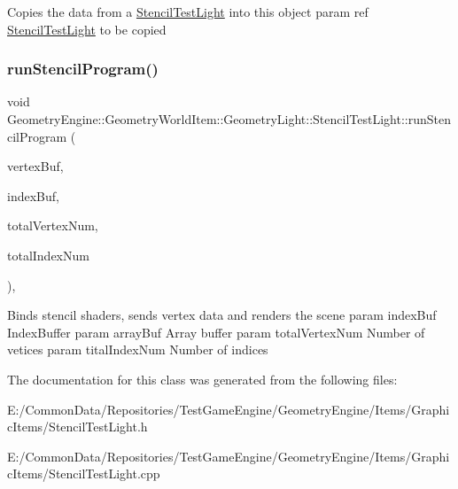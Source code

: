 Copies the data from a \mbox{\hyperlink{class_geometry_engine_1_1_geometry_world_item_1_1_geometry_light_1_1_stencil_test_light}{Stencil\+Test\+Light}} into this object param ref \mbox{\hyperlink{class_geometry_engine_1_1_geometry_world_item_1_1_geometry_light_1_1_stencil_test_light}{Stencil\+Test\+Light}} to be copied \mbox{\label{class_geometry_engine_1_1_geometry_world_item_1_1_geometry_light_1_1_stencil_test_light_a619546f72b149132ea11a28796d307ff}} 
\subsubsection{\texorpdfstring{runStencilProgram()}{runStencilProgram()}}
{\footnotesize\ttfamily void Geometry\+Engine\+::\+Geometry\+World\+Item\+::\+Geometry\+Light\+::\+Stencil\+Test\+Light\+::run\+Stencil\+Program (\begin{DoxyParamCaption}\item[{Q\+Open\+G\+L\+Buffer $\ast$}]{vertex\+Buf,  }\item[{Q\+Open\+G\+L\+Buffer $\ast$}]{index\+Buf,  }\item[{unsigned int}]{total\+Vertex\+Num,  }\item[{unsigned int}]{total\+Index\+Num }\end{DoxyParamCaption})\hspace{0.3cm}{\ttfamily [protected]}, {\ttfamily [virtual]}}

Binds stencil shaders, sends vertex data and renders the scene param index\+Buf Index\+Buffer param array\+Buf Array buffer param total\+Vertex\+Num Number of vetices param tital\+Index\+Num Number of indices 

The documentation for this class was generated from the following files\+:\begin{DoxyCompactItemize}
\item 
E\+:/\+Common\+Data/\+Repositories/\+Test\+Game\+Engine/\+Geometry\+Engine/\+Items/\+Graphic\+Items/Stencil\+Test\+Light.\+h\item 
E\+:/\+Common\+Data/\+Repositories/\+Test\+Game\+Engine/\+Geometry\+Engine/\+Items/\+Graphic\+Items/Stencil\+Test\+Light.\+cpp\end{DoxyCompactItemize}
